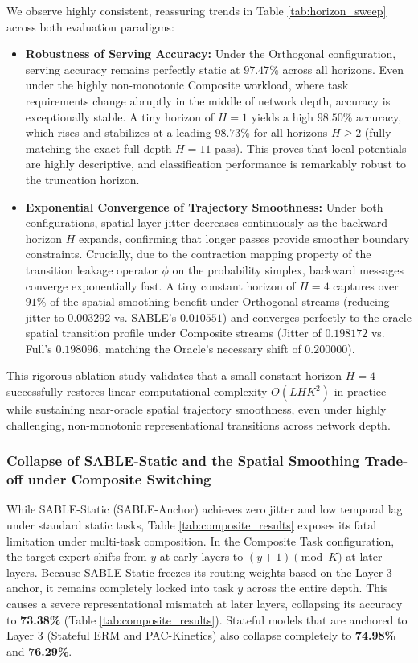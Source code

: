 We observe highly consistent, reassuring trends in Table \ref{tab:horizon_sweep} across both evaluation paradigms:
\begin{itemize}
    \item \textbf{Robustness of Serving Accuracy:} Under the Orthogonal configuration, serving accuracy remains perfectly static at $97.47\%$ across all horizons. Even under the highly non-monotonic Composite workload, where task requirements change abruptly in the middle of network depth, accuracy is exceptionally stable. A tiny horizon of $H=1$ yields a high $98.50\%$ accuracy, which rises and stabilizes at a leading $98.73\%$ for all horizons $H \ge 2$ (fully matching the exact full-depth $H=11$ pass). This proves that local potentials are highly descriptive, and classification performance is remarkably robust to the truncation horizon.
    \item \textbf{Exponential Convergence of Trajectory Smoothness:} Under both configurations, spatial layer jitter decreases continuously as the backward horizon $H$ expands, confirming that longer passes provide smoother boundary constraints. Crucially, due to the contraction mapping property of the transition leakage operator $\phi$ on the probability simplex, backward messages converge exponentially fast. A tiny constant horizon of $H=4$ captures over $91\%$ of the spatial smoothing benefit under Orthogonal streams (reducing jitter to $0.003292$ vs. SABLE's $0.010551$) and converges perfectly to the oracle spatial transition profile under Composite streams (Jitter of $0.198172$ vs. Full's $0.198096$, matching the Oracle's necessary shift of $0.200000$).
\end{itemize}
This rigorous ablation study validates that a small constant horizon $H = 4$ successfully restores linear computational complexity $O(L H K^2)$ in practice while sustaining near-oracle spatial trajectory smoothness, even under highly challenging, non-monotonic representational transitions across network depth.

\subsubsection{Collapse of SABLE-Static and the Spatial Smoothing Trade-off under Composite Switching}
While SABLE-Static (SABLE-Anchor) achieves zero jitter and low temporal lag under standard static tasks, Table \ref{tab:composite_results} exposes its fatal limitation under multi-task composition. In the Composite Task configuration, the target expert shifts from $y$ at early layers to $(y + 1) \pmod K$ at later layers. Because SABLE-Static freezes its routing weights based on the Layer 3 anchor, it remains completely locked into task $y$ across the entire depth. This causes a severe representational mismatch at later layers, collapsing its accuracy to \textbf{73.38\%} (Table \ref{tab:composite_results}). Stateful models that are anchored to Layer 3 (Stateful ERM and PAC-Kinetics) also collapse completely to \textbf{74.98\%} and \textbf{76.29\%}.

